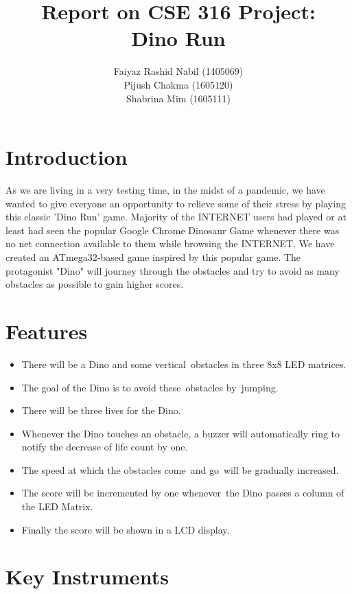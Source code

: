 \documentclass[a4paper]{article}
\title{\textbf{Report on CSE 316 Project: \\Dino Run}}
\author[]{Faiyaz Rashid Nabil (1405069) \\ Pijush Chakma (1605120) \\ Shabrina Mim (1605111)}
\affil[]{Department of Computer Science \& Engineering, BUET}
\date{}
\begin{document}
\maketitle
\section{Introduction}

As we are living in a very testing time, in the midst of a pandemic, we have wanted to give everyone an opportunity to relieve some of their stress by playing this classic 'Dino Run' game. Majority of the INTERNET users had played or at least had seen the popular Google Chrome Dinosaur Game whenever there was no net connection available to them while browsing the INTERNET. We have created an ATmega32-based game inspired by this popular game. The protagonist "Dino" will journey through the obstacles and try to avoid as many obstacles as possible to gain higher scores.

\section{Features}
\begin{itemize}
	
	\item There will be a Dino and some vertical obstacles in three 8x8 LED matrices.
	\item The goal of the Dino is to avoid these obstacles by jumping. 
	\item There will be three lives for the Dino.
	\item Whenever the Dino touches an obstacle, a buzzer will automatically ring to notify the decrease of life count by one.
	\item The speed at which the obstacles come and go will be gradually increased.
	\item The score will be incremented by one whenever the Dino passes a column of the LED Matrix.
    \item Finally the score will be shown in a LCD display.
	
	\end{itemize}

\section{Key Instruments}
\end{document}
